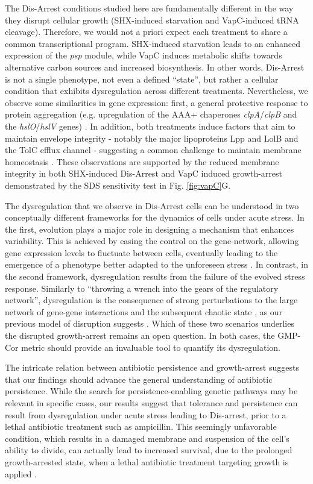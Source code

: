 \documentclass[12pt]{article}
\begin{document}
The Dis-Arrest conditions studied here are fundamentally different in the way they disrupt cellular growth (SHX-induced starvation and VapC-induced tRNA cleavage). Therefore, we would not a priori expect each treatment to share a common transcriptional program. SHX-induced starvation leads to an enhanced expression of the \textit{psp} module, while VapC induces metabolic shifts towards alternative carbon sources and increased biosynthesis\cite{Ronine2025}. In other words, Dis-Arrest is not a single phenotype, not even a defined ``state'', but rather a cellular condition that exhibits dysregulation across different treatments. Nevertheless, we observe some similarities in gene expression: first, a general protective response to protein aggregation (e.g. upregulation of the AAA+ chaperones \textit{clpA}/\textit{clpB} and the \textit{hslO}/\textit{hslV} genes) \cite{Kanemori1997,Kim2022}. In addition, both treatments induce factors that aim to maintain envelope integrity - notably the major lipoproteins Lpp and LolB and the TolC efflux channel - suggesting a common challenge to maintain membrane homeostasis \cite{Mathelié-Guinlet2020,Zhu2024}. These observations are supported by the reduced membrane integrity in both SHX-induced Dis-Arrest \cite{Rotem2024} and VapC induced growth-arrest demonstrated by the SDS sensitivity test in Fig. \ref{fig:vapC}G. \par
The dysregulation that we observe in Dis-Arrest cells can be understood in two conceptually different frameworks for the dynamics of cells under acute stress. In the first, evolution plays a major role in designing a mechanism that enhances variability. This is achieved by easing the control on the gene-network, allowing gene expression levels to fluctuate between cells, eventually leading to the emergence of a phenotype better adapted to the unforeseen stress \cite{Braun_2015, Freddolino2018}. In contrast, in the second framework, dysregulation results from the failure of the evolved stress response. Similarly to ``throwing a wrench into the gears of the regulatory network'', dysregulation is the consequence of strong perturbations to the large network of gene-gene interactions and the subsequent chaotic state \cite{MESTL1996}, as our previous model of disruption suggests \cite{Kaplan2021}. Which of these two scenarios underlies the disrupted growth-arrest remains an open question. In both cases, the GMP-Cor metric should provide an invaluable tool to quantify its dysregulation.\par
The intricate relation between antibiotic persistence and growth-arrest suggests that our findings should advance the general understanding of antibiotic persistence. While the search for persistence-enabling genetic pathways may be relevant in specific cases, our results suggest that tolerance and persistence can result from dysregulation under acute stress leading to Dis-arrest, prior to a lethal antibiotic treatment such as ampicillin. This seemingly unfavorable condition, which results in a damaged membrane and suspension of the cell's ability to divide, can actually lead to increased survival, due to the prolonged growth-arrested state, when a lethal antibiotic treatment targeting growth is applied \cite{Balaban2004,Rotem2024}.
\end{document}
